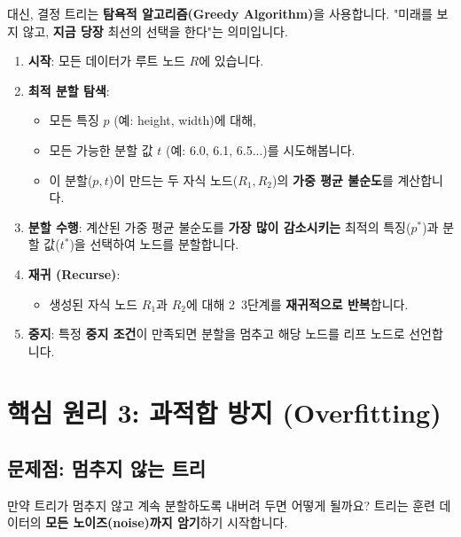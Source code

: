 \documentclass[11pt,a4paper]{book}
\theoremstyle{definition}
\begin{document}
대신, 결정 트리는 \textbf{탐욕적 알고리즘(Greedy Algorithm)}을 사용합니다.
"미래를 보지 않고, \textbf{지금 당장} 최선의 선택을 한다"는 의미입니다.

\begin{enumerate}
    \item \textbf{시작}: 모든 데이터가 루트 노드 $R$에 있습니다.
    \item \textbf{최적 분할 탐색}:
        \begin{itemize}
            \item 모든 특징 $p$ (예: height, width)에 대해,
            \item 모든 가능한 분할 값 $t$ (예: 6.0, 6.1, 6.5...)를 시도해봅니다.
            \item 이 분할($p, t$)이 만드는 두 자식 노드($R_1, R_2$)의 \textbf{가중 평균 불순도}를 계산합니다.
        \end{itemize}
    \item \textbf{분할 수행}: 계산된 가중 평균 불순도를 \textbf{가장 많이 감소시키는} 최적의 특징($p^*$)과 분할 값($t^*$)을 선택하여 노드를 분할합니다.
    \item \textbf{재귀 (Recurse)}:
        \begin{itemize}
            \item 생성된 자식 노드 $R_1$과 $R_2$에 대해 2~3단계를 \textbf{재귀적으로 반복}합니다.
        \end{itemize}
    \item \textbf{중지}: 특정 \textbf{중지 조건}이 만족되면 분할을 멈추고 해당 노드를 리프 노드로 선언합니다.
\end{enumerate}


\section{핵심 원리 3: 과적합 방지 (Overfitting)}

\subsection{문제점: 멈추지 않는 트리}

만약 트리가 멈추지 않고 계속 분할하도록 내버려 두면 어떻게 될까요?
트리는 훈련 데이터의 \textbf{모든 노이즈(noise)까지 암기}하기 시작합니다.

\end{document}
